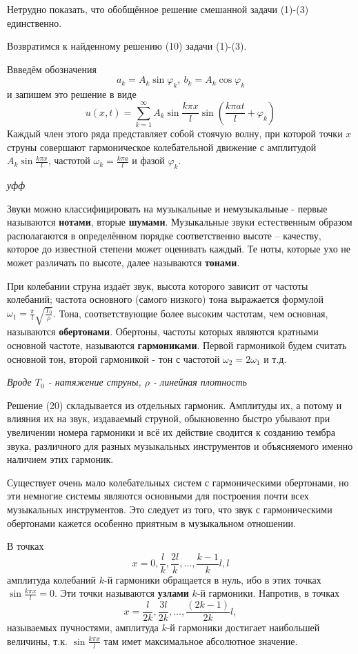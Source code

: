 Нетрудно показать, что обобщённое решение смешанной задачи (1)-(3) единственно.

Возвратимся к найденному решению (10) задачи (1)-(3).

Ввведём обозначения
\[
	a_k = A_k \sin \varphi_k, ~ b_k = A_k \cos \varphi_k
\]
и запишем это решение в виде
\[
	u(x, t) = \sum_{k=1}^\infty A_k \sin \frac{k \pi x}{l} \sin \left( \frac{k \pi at}{l} + \varphi_k \right) \tag{20}
\]
Каждый член этого ряда представляет собой стоячую волну, при которой точки $x$ струны совершают гармоническое колебательной движение с амплитудой $A_k \sin \frac{k \pi x}{l}$, частотой $\omega_k = \frac{k \pi a}{l}$ и фазой $\varphi_k$.

\textit{уфф}

Звуки можно классифицировать на музыкальные и немузыкальные - первые называются \textbf{нотами}, вторые \textbf{шумами}. Музыкальные звуки естественным образом располагаются в определённом порядке соответственно высоте -- качеству, которое до известной степени может оценивать каждый. Те ноты, которые ухо не может различать по высоте, далее называются \textbf{тонами}.

При колебании струна издаёт звук, высота которого зависит от частоты колебаний; частота основного (самого низкого) тона выражается формулой $\omega_1 = \frac{\pi}{l} \sqrt{\frac{T_0}{\rho}}$. Тона, соответствующие более высоким частотам, чем основная, называются \textbf{обертонами}. Обертоны, частоты которых являются кратными основной частоте, называются \textbf{гармониками}. Первой гармоникой будем считать основной тон, второй гармоникой - тон с частотой $\omega_2 = 2 \omega_1$ и т.д.

\textit{Вроде $T_0$ - натяжение струны, $\rho$ - линейная плотность}

Решение (20) складывается из отдельных гармоник. Амплитуды их, а потому и влияния их на звук, издаваемый струной, обыкновенно быстро убывают при увеличении номера гармоники и всё их действие сводится к созданию тембра звука, различного для разных музыкальных инструментов и объясняемого именно наличием этих гармоник.

Существует очень мало колебательных систем с гармоническими обертонами, но эти немногие системы являются основными для построения почти всех музыкальных инструментов. Это следует из того, что звук с гармоническими обертонами кажется особенно приятным в музыкальном отношении.

В точках
\[
	x = 0, \frac{l}{k}, \frac{2l}{k}, \dots, \frac{k-1}{k} l, l
\]
амплитуда колебаний $k$-й гармоники обращается в нуль, ибо в этих точках $\sin \frac{k \pi x}{l}=0$. Эти точки называются \textbf{узлами} $k$-й гармоники. Напротив, в точках
\[
	x = \frac{l}{2k}, \frac{3l}{2k}, \dots, \frac{(2k-1)}{2k} l,
\]
называемых пучностями, амплитуда $k$-й гармоники достигает наибольшей величины, т.к. $\sin \frac{k \pi x}{l}$ там имет максимальное абсолютное значение.

